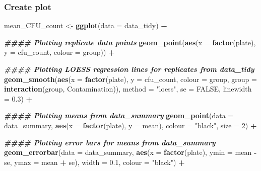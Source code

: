 \documentclass[
]{article}
\newenvironment{Shaded}{\begin{snugshade}}{\end{snugshade}}
\newcommand{\AttributeTok}[1]{\textcolor[rgb]{0.13,0.29,0.53}{#1}}
\newcommand{\ConstantTok}[1]{\textcolor[rgb]{0.56,0.35,0.01}{#1}}
\newcommand{\DecValTok}[1]{\textcolor[rgb]{0.00,0.00,0.81}{#1}}
\newcommand{\DocumentationTok}[1]{\textcolor[rgb]{0.56,0.35,0.01}{\textbf{\textit{#1}}}}
\newcommand{\FloatTok}[1]{\textcolor[rgb]{0.00,0.00,0.81}{#1}}
\newcommand{\FunctionTok}[1]{\textcolor[rgb]{0.13,0.29,0.53}{\textbf{#1}}}
\newcommand{\NormalTok}[1]{#1}
\newcommand{\OtherTok}[1]{\textcolor[rgb]{0.56,0.35,0.01}{#1}}
\newcommand{\SpecialCharTok}[1]{\textcolor[rgb]{0.81,0.36,0.00}{\textbf{#1}}}
\newcommand{\StringTok}[1]{\textcolor[rgb]{0.31,0.60,0.02}{#1}}
\begin{document}
\subsubsection{Create plot}\label{create-plot}

\begin{Shaded}
\begin{Highlighting}[]
\NormalTok{mean\_CFU\_count }\OtherTok{\textless{}{-}} \FunctionTok{ggplot}\NormalTok{(}\AttributeTok{data =}\NormalTok{ data\_tidy) }\SpecialCharTok{+}
  
  \DocumentationTok{\#\#\#\# Plotting replicate data points}
  \FunctionTok{geom\_point}\NormalTok{(}\FunctionTok{aes}\NormalTok{(}\AttributeTok{x =} \FunctionTok{factor}\NormalTok{(plate), }
                 \AttributeTok{y =}\NormalTok{ cfu\_count, }
                 \AttributeTok{colour =}\NormalTok{ group)) }\SpecialCharTok{+}
  
  \DocumentationTok{\#\#\#\# Plotting LOESS regression lines for replicates from data\_tidy}
  \FunctionTok{geom\_smooth}\NormalTok{(}\FunctionTok{aes}\NormalTok{(}\AttributeTok{x =} \FunctionTok{factor}\NormalTok{(plate), }
                  \AttributeTok{y =}\NormalTok{ cfu\_count, }
                  \AttributeTok{colour =}\NormalTok{ group,}
                  \AttributeTok{group =} \FunctionTok{interaction}\NormalTok{(group, Contamination)), }
              \AttributeTok{method =} \StringTok{"loess"}\NormalTok{, }
              \AttributeTok{se =} \ConstantTok{FALSE}\NormalTok{,}
              \AttributeTok{linewidth =} \FloatTok{0.3}\NormalTok{) }\SpecialCharTok{+}
  
  \DocumentationTok{\#\#\#\# Plotting means from data\_summary}
  \FunctionTok{geom\_point}\NormalTok{(}\AttributeTok{data =}\NormalTok{ data\_summary, }
             \FunctionTok{aes}\NormalTok{(}\AttributeTok{x =} \FunctionTok{factor}\NormalTok{(plate), }
                 \AttributeTok{y =}\NormalTok{ mean), }
             \AttributeTok{colour =} \StringTok{"black"}\NormalTok{, }
             \AttributeTok{size =} \DecValTok{2}\NormalTok{) }\SpecialCharTok{+}
  
  \DocumentationTok{\#\#\#\# Plotting error bars for means from data\_summary}
  \FunctionTok{geom\_errorbar}\NormalTok{(}\AttributeTok{data =}\NormalTok{ data\_summary,}
                \FunctionTok{aes}\NormalTok{(}\AttributeTok{x =} \FunctionTok{factor}\NormalTok{(plate), }
                    \AttributeTok{ymin =}\NormalTok{ mean }\SpecialCharTok{{-}}\NormalTok{ se, }
                    \AttributeTok{ymax =}\NormalTok{ mean }\SpecialCharTok{+}\NormalTok{ se), }
                \AttributeTok{width =} \FloatTok{0.1}\NormalTok{, }
                \AttributeTok{colour =} \StringTok{"black"}\NormalTok{) }\SpecialCharTok{+}
  

\end{Highlighting}
\end{Shaded}
\end{document}
